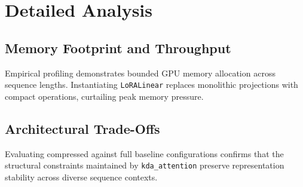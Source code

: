 \section{Detailed Analysis}

\subsection{Memory Footprint and Throughput}
Empirical profiling demonstrates bounded GPU memory allocation across sequence lengths. Instantiating \texttt{LoRALinear} replaces monolithic projections with compact operations, curtailing peak memory pressure.

\subsection{Architectural Trade-Offs}
Evaluating compressed against full baseline configurations confirms that the structural constraints maintained by \texttt{kda_attention} preserve representation stability across diverse sequence contexts.
